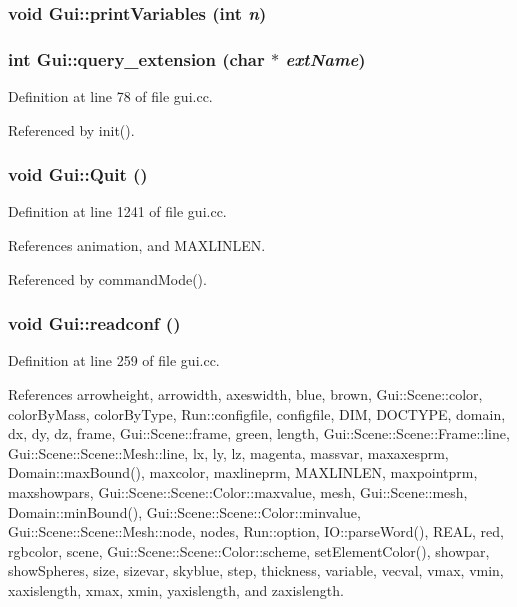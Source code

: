\hypertarget{namespaceGui_02455eabb69d94328ba20a3d8abd5239}{
\subsubsection[{printVariables}]{\setlength{\rightskip}{0pt plus 5cm}void Gui::printVariables (int {\em n})}}
\label{namespaceGui_02455eabb69d94328ba20a3d8abd5239}


\hypertarget{namespaceGui_7fbca852fb0cacc6663ba5689441c628}{
\subsubsection[{query\_\-extension}]{\setlength{\rightskip}{0pt plus 5cm}int Gui::query\_\-extension (char $\ast$ {\em extName})}}
\label{namespaceGui_7fbca852fb0cacc6663ba5689441c628}




Definition at line 78 of file gui.cc.

Referenced by init().\hypertarget{namespaceGui_6fda3017d1da246375076a92d719888e}{
\subsubsection[{Quit}]{\setlength{\rightskip}{0pt plus 5cm}void Gui::Quit ()}}
\label{namespaceGui_6fda3017d1da246375076a92d719888e}




Definition at line 1241 of file gui.cc.

References animation, and MAXLINLEN.

Referenced by commandMode().\hypertarget{namespaceGui_adc1ae9662345d502dd4bccf0ea58473}{
\subsubsection[{readconf}]{\setlength{\rightskip}{0pt plus 5cm}void Gui::readconf ()}}
\label{namespaceGui_adc1ae9662345d502dd4bccf0ea58473}




Definition at line 259 of file gui.cc.

References arrowheight, arrowidth, axeswidth, blue, brown, Gui::Scene::color, colorByMass, colorByType, Run::configfile, configfile, DIM, DOCTYPE, domain, dx, dy, dz, frame, Gui::Scene::frame, green, length, Gui::Scene::Scene::Frame::line, Gui::Scene::Scene::Mesh::line, lx, ly, lz, magenta, massvar, maxaxesprm, Domain::maxBound(), maxcolor, maxlineprm, MAXLINLEN, maxpointprm, maxshowpars, Gui::Scene::Scene::Color::maxvalue, mesh, Gui::Scene::mesh, Domain::minBound(), Gui::Scene::Scene::Color::minvalue, Gui::Scene::Scene::Mesh::node, nodes, Run::option, IO::parseWord(), REAL, red, rgbcolor, scene, Gui::Scene::Scene::Color::scheme, setElementColor(), showpar, showSpheres, size, sizevar, skyblue, step, thickness, variable, vecval, vmax, vmin, xaxislength, xmax, xmin, yaxislength, and zaxislength.

